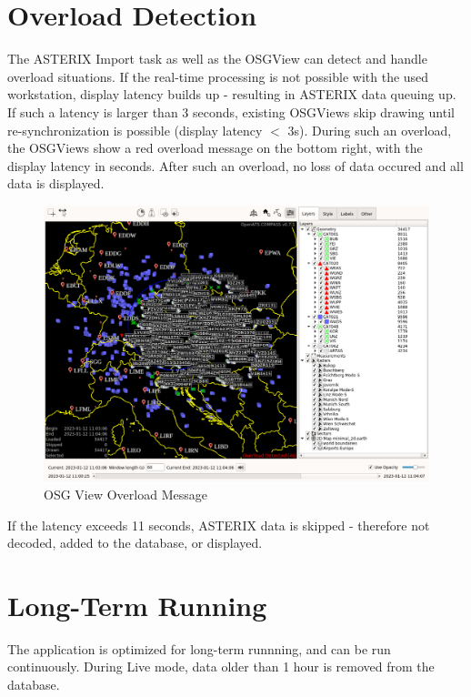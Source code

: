 \section{Overload Detection}

The ASTERIX Import task as well as the OSGView can detect and handle overload situations. If the real-time processing is not possible with the used workstation, display latency builds up - resulting in ASTERIX data queuing up. \\

If such a latency is larger than 3 seconds,  existing OSGViews skip drawing until re-synchronization is possible (display latency $<$ 3s). During such an overload, the OSGViews show a red overload message on the bottom right, with the display latency in seconds. After such an overload, no loss of data occured and all data is displayed. \\

\begin{figure}[H]
    \hspace*{-2.5cm}
    \includegraphics[width=19cm,frame]{figures/osgview_overload.png}
  \caption{OSG View Overload Message}
\end{figure} 

If the latency exceeds 11 seconds, ASTERIX data is skipped - therefore not decoded, added to the database, or displayed.

\section{Long-Term Running}

The application is optimized for long-term runnning, and can be run continuously. During Live mode, data older than 1 hour is removed from the database. \\

